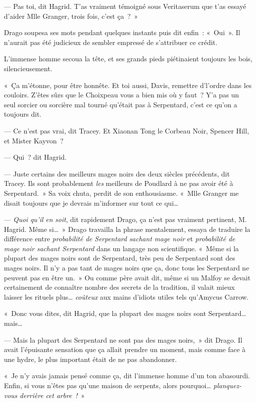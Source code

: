--- Pas toi, dit Hagrid.
T'as vraiment témoigné sous Veritaserum que t'as essayé d'aider Mlle Granger, trois fois, c'est ça~?~»

Drago soupesa ses mots pendant quelques instants puis dit enfin~: «~Oui~».
Il n'aurait pas été judicieux de sembler empressé de s'attribuer ce crédit.

L'immense homme secoua la tête, et ses grands pieds piétinaient toujours les bois, silencieusement.

«~Ça m'étonne, pour être honnête.
Et toi aussi, Davis, remettre d'l'ordre dans les couloirs.
Z'êtes sûrs que le Choixpeau vous a bien mis où y faut~?
Y'a pas un seul sorcier ou sorcière mal tourné qu'était pas à Serpentard, c'est ce qu'on a toujours dit.

--- Ce n'est pas vrai, dit Tracey.
Et Xiaonan Tong le Corbeau Noir, Spencer Hill, et Mister Kayvon~?

--- Qui~? dit Hagrid.

--- Juste certains des meilleurs mages noirs des deux siècles précédents, dit Tracey.
Ils sont probablement \emph{les} meilleurs de Poudlard à ne pas avoir été à Serpentard.~»
Sa voix chuta, perdit de son enthousiasme.
«~Mlle Granger me disait toujours que je devrais m'informer sur tout ce qui…

--- \emph{Quoi qu'il en soit}, dit rapidement Drago, ça n'est pas vraiment pertinent, M. Hagrid.
Même si…~»
Drago travailla la phrase mentalement, essaya de traduire la différence entre \emph{probabilité de Serpentard sachant mage noir} et \emph{probabilité de mage noir sachant Serpentard} dans un langage non scientifique.
«~Même si la plupart des mages noirs sont de Serpentard, très peu de Serpentard sont des mages noirs.
Il n'y a pas tant de mages noirs que ça, donc tous les Serpentard ne peuvent pas en être un.~»
Ou comme père avait dit, même si un Malfoy se devait certainement de connaître nombre des secrets de la tradition, il valait mieux laisser les rituels plus…
\emph{coûteux} aux mains d'idiots utiles tels qu'Amycus Carrow.

«~Donc vous dites, dit Hagrid, que la plupart des mages noirs sont Serpentard… mais…

--- Mais la plupart des Serpentard ne sont pas des mages noirs,~» dit Drago.
Il avait l'épuisante sensation que ça allait prendre un moment, mais comme face à une hydre, le plus important était de ne pas abandonner.

«~Je n'y avais jamais pensé comme ça, dit l'immense homme d'un ton abasourdi.
Enfin, si vous n'êtes pas qu'une maison de serpents, alors pourquoi…
\emph{planquez-vous derrière cet arbre~!}~»

